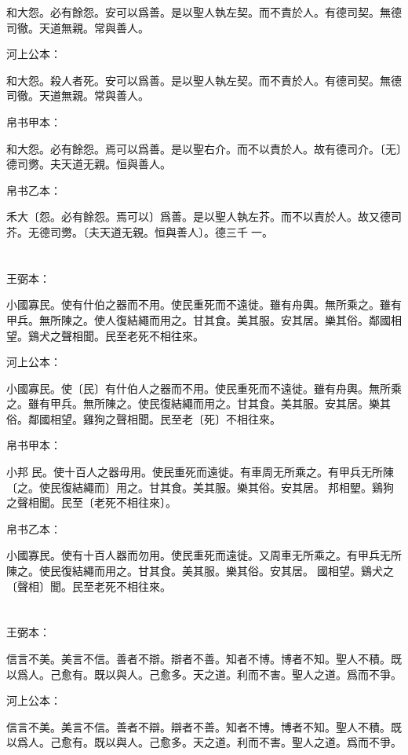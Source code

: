 \documentclass[a5paper]{ctexbook}
\begin{document}
    和大怨。必有餘怨。安可以爲善。是以聖人執左契。而不責於人。有德司契。無德司徹。天道無親。常與善人。

    河上公本：

    和大怨。殺人者死。安可以爲善。是以聖人執左契。而不責於人。有德司契。無德司徹。天道無親。常與善人。

    帛书甲本：

    和大怨。必有餘怨。焉可以爲善。是以聖右介。而不以責於人。故有德司介。〔无〕德司勶。夫天道无親。恒與善人。

    帛书乙本：

    禾大〔怨。必有餘怨。焉可以〕爲善。是以聖人執左芥。而不以責於人。故又德司芥。无德司勶。〔夫天道无親。恒與善人〕。德三千𠦜一。

    \chapter{}
    王弼本：

    小國寡民。使有什伯之器而不用。使民重死而不遠徙。雖有舟輿。無所乘之。雖有甲兵。無所陳之。使人復結繩而用之。甘其食。美其服。安其居。樂其俗。鄰國相望。鷄犬之聲相聞。民至老死不相往來。

    河上公本：

    小國寡民。使〔民〕有什伯人之器而不用。使民重死而不遠徙。雖有舟輿。無所乘之。雖有甲兵。無所陳之。使民復結繩而用之。甘其食。美其服。安其居。樂其俗。鄰國相望。雞狗之聲相聞。民至老〔死〕不相往來。

    帛书甲本：

    小邦󱁈民。使十百人之器毋用。使民重死而遠徙。有車周无所乘之。有甲兵无所陳〔之。使民復結繩而〕用之。甘其食。美其服。樂其俗。安其居。󱁉邦相朢。鷄狗之聲相聞。民至〔老死不相往來〕。

    帛书乙本：

    小國寡民。使有十百人器而勿用。使民重死而遠徙。又周車无所乘之。有甲兵无所陳之。使民復結繩而用之。甘其食。美其服。樂其俗。安其居。𠳵國相望。鷄犬之〔聲相〕聞。民至老死不相往來。

    \chapter{}
    王弼本：

    信言不美。美言不信。善者不辯。辯者不善。知者不博。博者不知。聖人不積。既以爲人。己愈有。既以與人。己愈多。天之道。利而不害。聖人之道。爲而不爭。

    河上公本：

    信言不美。美言不信。善者不辯。辯者不善。知者不博。博者不知。聖人不積。既以爲人。己愈有。既以與人。己愈多。天之道。利而不害。聖人之道。爲而不爭。
\end{document}

